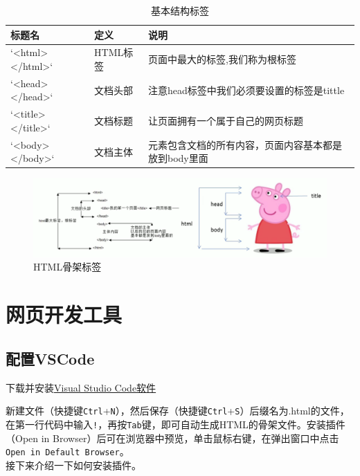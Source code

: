 \documentclass[
]{book}
\begin{document}
\begin{table}

\caption{\label{tab:unnamed-chunk-4}基本结构标签}
\centering
\begin{tabular}[t]{lll}
\toprule
标题名 & 定义 & 说明\\
\midrule
`<html></html>` & HTML标签 & 页面中最大的标签,我们称为根标签\\
`<head></head>` & 文档头部 & 注意head标签中我们必须要设置的标签是tittle\\
`<title></title>` & 文档标题 & 让页面拥有一个属于自己的网页标题\\
`<body></body>` & 文档主体 & 元素包含文档的所有内容，页面内容基本都是放到body里面\\
\bottomrule
\end{tabular}
\end{table}

\begin{figure}

{\centering \includegraphics{fig/1-2} 

}

\caption{HTML骨架标签}\label{fig:unnamed-chunk-5}
\end{figure}

\hypertarget{ux7f51ux9875ux5f00ux53d1ux5de5ux5177}{%
\chapter{网页开发工具}\label{ux7f51ux9875ux5f00ux53d1ux5de5ux5177}}

\hypertarget{ux914dux7f6evscode}{%
\section{配置VSCode}\label{ux914dux7f6evscode}}

下载并安装\href{https://code.visualstudio.com/download}{Visual Studio Code软件}

新建文件（快捷键\texttt{Ctrl}+\texttt{N}），然后保存（快捷键\texttt{Ctrl}+\texttt{S}）后缀名为.html的文件，在第一行代码中输入\texttt{!}，再按\texttt{Tab}键，即可自动生成HTML的骨架文件。安装插件（Open in Browser）后可在浏览器中预览，单击鼠标右键，在弹出窗口中点击\texttt{Open\ in\ Default\ Browser}。\\
接下来介绍一下如何安装插件。
\end{document}
